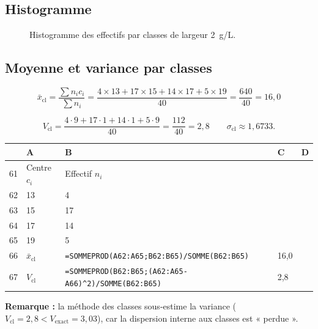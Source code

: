 \documentclass[11pt,a4paper]{article}
\newenvironment{calcsheet}[1][\footnotesize]
  {\begin{center}#1
   \begin{tabular}{|>{\columncolor{calchead}}c|l|l|l|l|}
   \hline
   \rowcolor{calchead}
   & \textbf{A} & \textbf{B} & \textbf{C} & \textbf{D} \\ \hline}
  {\end{tabular}\end{center}}
\newcommand{\fc}[1]{\textcolor{calcform}{\texttt{#1}}}
\begin{document}
\subsection{Histogramme}

\begin{figure}[H]
\centering
{}
\caption{Histogramme des effectifs par classes de largeur \SI{2}{g/L}.}
\end{figure}

\subsection{Moyenne et variance par classes}

\[
\bar{x}_{\text{cl}} = \frac{\sum n_i c_i}{\sum n_i}
= \frac{4\times 13 + 17\times 15 + 14\times 17 + 5\times 19}{40}
= \frac{640}{40} = \boxed{16{,}0}
\]

\[
V_{\text{cl}} = \frac{4\cdot 9 + 17\cdot 1 + 14\cdot 1 + 5\cdot 9}{40}
= \frac{112}{40} = \boxed{2{,}8}
\qquad
\sigma_{\text{cl}} \approx \boxed{1{,}6733}.
\]

\begin{calcsheet}
61 & Centre \( c_i \) & Effectif \( n_i \) & & \\ \hline
62 & 13 & 4  & & \\ \hline
63 & 15 & 17 & & \\ \hline
64 & 17 & 14 & & \\ \hline
65 & 19 & 5  & & \\ \hline
66 & \( \bar{x}_{\text{cl}} \) & \fc{=SOMMEPROD(A62:A65;B62:B65)/SOMME(B62:B65)} & 16,0 & \\ \hline
67 & \( V_{\text{cl}} \) & \fc{=SOMMEPROD(B62:B65;(A62:A65-A66)\^{}2)/SOMME(B62:B65)} & 2,8 & \\ \hline
\end{calcsheet}

\noindent\textbf{Remarque :} la méthode des classes sous-estime la variance
(\( V_{\text{cl}} = 2{,}8 < V_{\text{exact}} = 3{,}03 \)),
car la dispersion interne aux classes est « perdue ».
\end{document}
